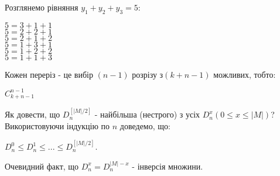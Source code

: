 \begin{example}
Розглянемо рівняння $ y_1 + y_2 + y_3 = 5 $:
\begin{center}
$ 5 = 3 + 1 + 1 $
\\
$ 5 = 2 + 2 + 1 $
\\
$ 5 = 2 + 1 + 2 $
\\
$ 5 = 1 + 3 + 1 $
\\
$ 5 = 1 + 2 + 2 $
\\
$ 5 = 1 + 1 + 3 $
\end{center}
\end{example}

Кожен переріз - це вибір $(n-1)$ розрізу з$(k+n-1)$ можливих, тобто:
\begin{center}
$C_{k+n-1}^{n-1}$
\end{center}

Як довести, що $D_n^{[|M|/2]}$ - найбільша (нестрого) з усіх $D_n^x (0 \leq x \leq |M|)$? Використовуючи індукцію по $n$ доведемо, що:
\begin{center}
$ D_n^0 \leq D_n^1 \leq ... \leq D_n^{[|M|/2]}$.
\end{center}
Очевидний факт, що $D_n^x = D_n^{|M|-x}$ - інверсія множини.

